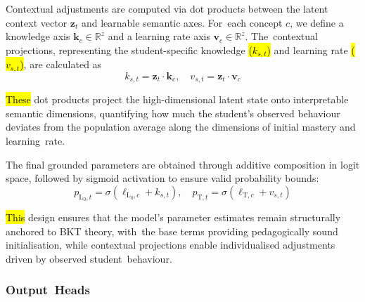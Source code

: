 \documentclass[applsci,article,accept,moreauthors,pdftex]{Definitions/mdpi}
\begin{document}
Contextual adjustments are computed via dot products between the latent context vector $\mathbf{z}_t$ and learnable semantic axes. For~each concept $c$, we define a knowledge axis $\mathbf{k}_{c} \in \mathbb{R}^{z}$ and a learning rate axis $\mathbf{v}_{c} \in \mathbb{R}^{z}$. The~contextual projections, representing the student-specific knowledge \hl{($k_{s,t}$)} and learning rate \hl{($v_{s,t}$)}, are calculated as
\begin{equation} \label{eq:contextual_projection}
    k_{s,t} = \mathbf{z}_t \cdot \mathbf{k}_c, \quad v_{s,t} = \mathbf{z}_t \cdot \mathbf{v}_c
\end{equation}

\hl{These} dot products project the high-dimensional latent state onto interpretable semantic dimensions, quantifying how much the student's observed {behaviour} deviates from the population average along the dimensions of initial mastery and learning~rate.

The final grounded parameters are obtained through additive composition in logit space, followed by sigmoid activation to ensure valid probability bounds:
\begin{equation} \label{eq:grounded_params}
    p_{\text{L}_0,t} = \sigma(\ell_{\text{L}_0,c} + k_{s,t}), \quad p_{\text{T},t} = \sigma(\ell_{\text{T},c} + v_{s,t})
\end{equation}

\hl{This} design ensures that the model's parameter estimates remain structurally anchored to BKT theory, with~the base terms providing pedagogically sound {initialisation}, while contextual projections enable {individualised} adjustments driven by observed student~{behaviour}.

\subsubsection{Output~Heads} \label{sec_output_heads}
\end{document}
